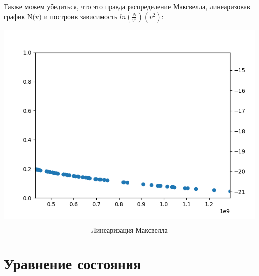 \documentclass[a4paper, 12pt]{article}
\begin{document}
Также можем убедиться, что это правда распределение Максвелла, линеаризовав график N(v) и построив зависимость $ln(\frac{N}{v^2}) (v^2)$:
\begin{center}
\includegraphics[scale=0.8]{max}
\end{center}
\[\textit{Линеаризация Максвелла}\]

\part{Уравнение состояния}
\end{document}
